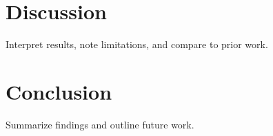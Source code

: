 \documentclass{article}
\begin{document}
\section{Discussion}
\label{sec:discussion}

Interpret results, note limitations, and compare to prior work.

\section{Conclusion}
\label{sec:conclusion}

Summarize findings and outline future work.





\end{document}
